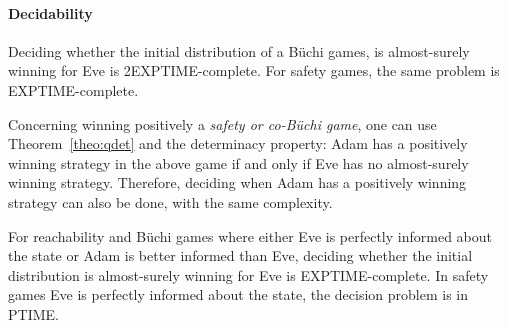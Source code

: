 \paragraph{Decidability}
\newcommand{\EXPTIME}{{\sc EXPTIME}}
\newcommand{\PTIME}{{\sc PTIME}}

\begin{theorem}
\label{th:main}
Deciding whether the initial distribution of a B{\"u}chi games,
is almost-surely winning for Eve is
2\EXPTIME-complete.
For safety games, the same problem is \EXPTIME-complete.
\end{theorem}

Concerning winning positively a {\em safety or co-B{\"u}chi game}, one
can use Theorem~\ref{theo:qdet} and the determinacy property: Adam
has a positively winning strategy in the above game if and only if
Eve has no almost-surely winning strategy. Therefore, deciding
when Adam has a positively winning strategy can also be done, with
the same complexity.


\begin{theorem}
\label{th:main2}
For reachability and B{\"u}chi games where either Eve is perfectly informed about the state
or Adam is
better informed than Eve, deciding whether the initial distribution is
almost-surely winning for Eve is
\EXPTIME-complete.
In safety games
Eve is perfectly
informed {about the state}, the decision problem is in \PTIME.
\end{theorem}

